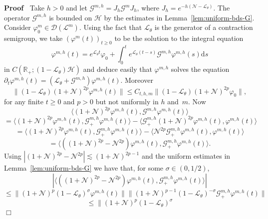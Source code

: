 \documentclass{article}
\newcommand{\mathd}{\mathrm{d}}
\newenvironment{proof}{\noindent\textbf{Proof\ }}{\hspace*{\fill}$\Box$\medskip}
\begin{document}
\begin{proof}
  Take $h > 0$ and let $\mathcal{G}^{m, h} = J_h \mathcal{G}^m J_h$, where
  $J_h = e^{- h (\mathcal{N}-\mathcal{L}_{\theta})}$. The operator
  $\mathcal{G}^{m, h}$ is bounded on $\mathcal{H}$ by the estimates in
  Lemma~\ref{lem:uniform-bds-G}. Consider $\varphi_0^m \in \mathcal{D}
  (\mathcal{L}^m)$. Using the fact that $\mathcal{L}_{\theta}$ is the
  generator of a contraction semigroup, we take $(\varphi^m (t))_{t \geqslant
  0}$ to be the solution to the integral equation
  \begin{equation}
    \varphi^{m, h} (t) = e^{\mathcal{L}_{\theta} t} \varphi_0 + \int_0^t
    e^{\mathcal{L}_{\theta} (t - s)} \mathcal{G}^{m, h} \varphi^{m, h} (s)
    \mathd s \label{eq:duhamel-mh}
  \end{equation}
  in $C (\mathbb{R}_+ ; (1 -\mathcal{L}_{\theta}) \mathcal{H})$ and deduce
  easily that $\varphi^{m, h}$ solves the equation $\partial_t \varphi^{m, h}
  (t) = (\mathcal{L}_{\theta} +\mathcal{G}^{m, h}) \varphi^{m, h} (t)$.
  Moreover
  \[ \| (1 -\mathcal{L}_{\theta}) (1 +\mathcal{N})^{2 p} \varphi^{m, h} (t) \|
     \leqslant C_{t, h, m} \| (1 -\mathcal{L}_{\theta}) (1 +\mathcal{N})^{2 p}
     \varphi_0 \|, \]
  for any finite $t \geqslant 0$ and $p > 0$ but not uniformly in $h$ and~$m$.
  Now
  \[ \langle (1 +\mathcal{N})^{2 p} \varphi^{m, h} (t), \mathcal{G}^{m, h}
     \varphi^{m, h} (t) \rangle \]
  \[ = \langle (1 +\mathcal{N})^{2 p} \varphi^{m, h} (t), \mathcal{G}^{m, h}_+
     \varphi^{m, h} (t) \rangle - \langle \mathcal{G}^{m, h}_+ (1
     +\mathcal{N})^{2 p} \varphi^{m, h} (t), \varphi^{m, h} (t) \rangle \]
  \[ = \langle (1 +\mathcal{N})^{2 p} \varphi^{m, h} (t), \mathcal{G}^{m, h}_+
     \varphi^{m, h} (t) \rangle - \langle \mathcal{N}^{2 p} \mathcal{G}^{m,
     h}_+ \varphi^{m, h} (t), \varphi^{m, h} (t) \rangle \]
  \[ = \langle ((1 +\mathcal{N})^{2 p} -\mathcal{N}^{2 p}) \varphi^{m, h} (t),
     \mathcal{G}^{m, h}_+ \varphi^{m, h} (t) \rangle . \]
  Using $| (1 +\mathcal{N})^{2 p} -\mathcal{N}^{2 p} | \lesssim (1
  +\mathcal{N})^{2 p - 1}$ and the uniform estimates in
  Lemma~\ref{lem:uniform-bds-G} we have that, for some $\sigma \in (0, 1 /
  2)$,
  \[ | \langle ((1 +\mathcal{N})^{2 p} -\mathcal{N}^{2 p}) \varphi^{m, h}
     (t), \mathcal{G}^{m, h}_+ \varphi^{m, h} (t) \rangle | \]
  \[ \leqslant \| (1 +\mathcal{N})^p (1 -\mathcal{L}_{\theta})^{\sigma}
     \varphi^{m, h} (t) \| \| (1 +\mathcal{N})^{p - 1} (1
     -\mathcal{L}_{\theta})^{- \sigma} \mathcal{G}^{m, h}_+ \varphi^{m, h} (t)
     \| \]
  \[ \leqslant \| (1 +\mathcal{N})^p (1 -\mathcal{L}_{\theta})^{\sigma}
\]
\end{proof}
\end{document}

